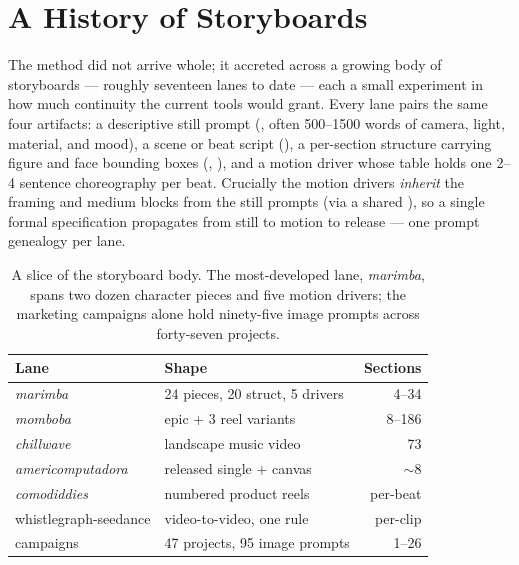 \documentclass[10pt,letterpaper,twocolumn]{article}
\begin{document}
\section{A History of Storyboards}
\label{sec:history}

The method did not arrive whole; it accreted across a growing body of
storyboards --- roughly seventeen lanes to date --- each a small experiment
in how much continuity the current tools would grant. Every lane pairs the
same four artifacts: a descriptive still prompt (, often
500--1500 words of camera, light, material, and mood), a scene or beat
script (), a per-section structure carrying figure and
face bounding boxes (, ), and a
motion driver whose  table holds one 2--4 sentence choreography
per beat. Crucially the motion drivers \emph{inherit} the framing and
medium blocks from the still prompts (via a shared ), so
a single formal specification propagates from still to motion to release ---
one prompt genealogy per lane.

\begin{table}[t]
  \footnotesize
  \renewcommand{\arraystretch}{1.15}
  \begin{tabularx}{\linewidth}{@{}lXr@{}}
    \toprule
    \textbf{Lane} & \textbf{Shape} & \textbf{Sections} \\
    \midrule
    \emph{marimba}      & 24 pieces, 20 struct, 5 drivers & 4--34 \\
    \emph{momboba}      & epic + 3 reel variants          & 8--186 \\
    \emph{chillwave}    & landscape music video           & 73 \\
    \emph{americomputadora} & released single + canvas    & $\sim$8 \\
    \emph{comodiddies}  & numbered product reels          & per-beat \\
    whistlegraph-seedance & video-to-video, one rule      & per-clip \\
    campaigns           & 47 projects, 95 image prompts   & 1--26 \\
    \bottomrule
  \end{tabularx}
  \caption{A slice of the storyboard body. The most-developed lane,
  \emph{marimba}, spans two dozen character pieces and five motion drivers;
  the marketing campaigns alone hold ninety-five image prompts across
  forty-seven projects.}
  \label{tab:lanes}
\end{table}
\end{document}
